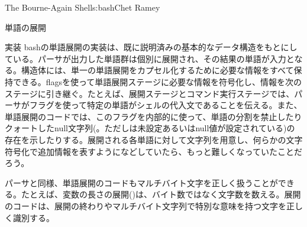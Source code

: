 \begin{aosachapter}{The Bourne-Again Shell}{s:bash}{Chet Ramey}
\begin{aosasect1}{単語の展開}
\begin{aosasect2}{実装}
bashの単語展開の実装は、既に説明済みの基本的なデータ構造をもとにしている。パーサが出力した単語群は個別に展開され、その結果の単語が入力となる。構造体には、単一の単語展開をカプセル化するために必要な情報をすべて保持できる。flagsを使って単語展開ステージに必要な情報を符号化し、情報を次のステージに引き継ぐ。たとえば、展開ステージとコマンド実行ステージでは、パーサがフラグを使って特定の単語がシェルの代入文であることを伝える。また、単語展開のコードでは、このフラグを内部的に使って、単語の分割を禁止したりクォートしたnull文字列(。ただしは未設定あるいはnull値が設定されている)の存在を示したりする。展開される各単語に対して文字列を用意し、何らかの文字符号化で追加情報を表すようになどしていたら、もっと難しくなっていたことだろう。

パーサと同様、単語展開のコードもマルチバイト文字を正しく扱うことができる。たとえば、変数の長さの展開()は、バイト数ではなく文字数を数える。展開のコードは、展開の終わりやマルチバイト文字列で特別な意味を持つ文字を正しく識別する。

\end{aosasect2}


\end{aosasect1}
\end{aosachapter}
